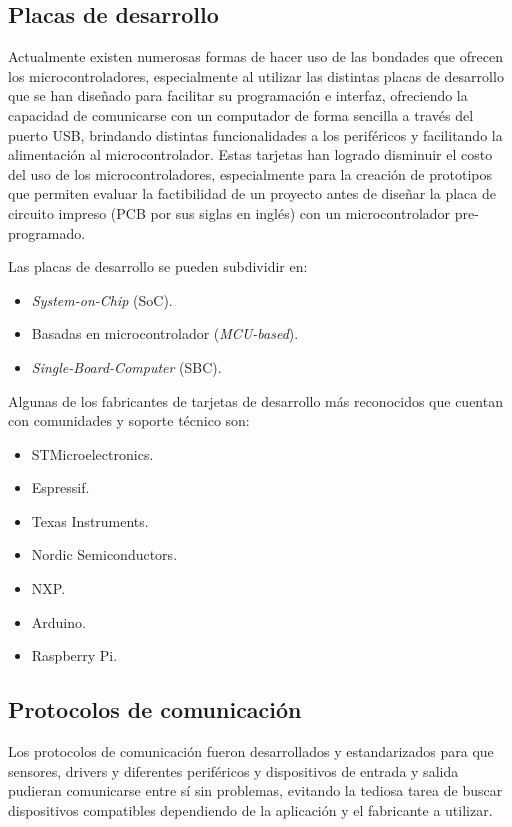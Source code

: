 \subsection{Placas de desarrollo}

Actualmente existen numerosas formas de hacer uso de las bondades que ofrecen los microcontroladores, especialmente al utilizar las distintas placas de desarrollo que se han diseñado para facilitar su programación e interfaz, ofreciendo la capacidad de comunicarse con un computador de forma sencilla a través del puerto USB, brindando distintas funcionalidades a los periféricos y facilitando la alimentación al microcontrolador. Estas tarjetas han logrado disminuir el costo del uso de los microcontroladores, especialmente para la creación de prototipos que permiten evaluar la factibilidad de un proyecto antes de diseñar la placa de circuito impreso (PCB por sus siglas en inglés) con un microcontrolador pre-programado.

Las placas de desarrollo se pueden subdividir en:


\begin{itemize}
    \item \textit{System-on-Chip} (SoC).
    \item Basadas en microcontrolador (\textit{MCU-based}).
    \item \textit{Single-Board-Computer} (SBC).
\end{itemize}
Algunas de los fabricantes de tarjetas de desarrollo más reconocidos que cuentan con comunidades y soporte técnico son:

\begin{itemize}
    \item STMicroelectronics.
    \item Espressif.
    \item Texas Instruments.
    \item Nordic Semiconductors.
    \item NXP.
    \item Arduino.
    \item Raspberry Pi.

\end{itemize}

\subsection{Protocolos de comunicación}

Los protocolos de comunicación fueron desarrollados y estandarizados para que sensores, drivers y diferentes periféricos y dispositivos de entrada y salida pudieran comunicarse entre sí sin problemas, evitando la tediosa tarea de buscar dispositivos compatibles dependiendo de la aplicación y el fabricante a utilizar. 

